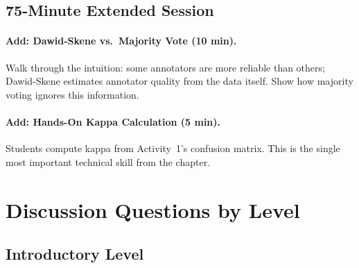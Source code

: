 \subsection{75-Minute Extended Session}

\paragraph{Add: Dawid-Skene vs.\ Majority Vote (10 min).}
Walk through the intuition: some annotators are more reliable than others; Dawid-Skene estimates annotator quality from the data itself. Show how majority voting ignores this information.

\paragraph{Add: Hands-On Kappa Calculation (5 min).}
Students compute kappa from Activity~1's confusion matrix. This is the single most important technical skill from the chapter.

\section{Discussion Questions by Level}

\subsection{Introductory Level}

